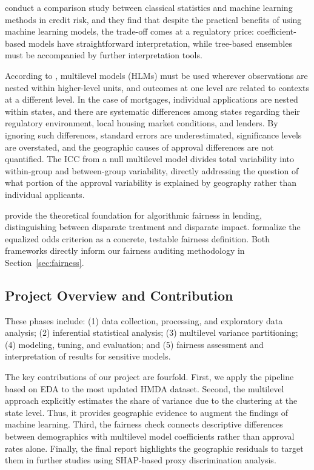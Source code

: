\documentclass[12pt,letterpaper]{article}
\begin{document}
\citet{zhang2024} conduct a comparison study between classical statistics and machine learning
methods in credit risk, and they find that despite the practical benefits of using machine learning models,
the trade-off comes at a regulatory price: coefficient-based models have straightforward interpretation,
while tree-based ensembles must be accompanied by further interpretation tools.

According to \citet{raudenbush2002}, multilevel models (HLMs) must be used wherever observations
are nested within higher-level units, and outcomes at one level are related to contexts at a
different level. In the case of mortgages, individual applications are nested within states, and
there are systematic differences among states regarding their regulatory environment, local
housing market conditions, and lenders. By ignoring such differences, standard errors are
underestimated, significance levels are overstated, and the geographic causes of approval
differences are not quantified. The ICC from a null multilevel model divides total variability
into within-group and between-group variability, directly addressing the question of what
portion of the approval variability is explained by geography rather than individual applicants.

\citet{barocas2016} provide the theoretical foundation for algorithmic fairness in lending,
distinguishing between disparate treatment and disparate impact. \citet{hardt2016} formalize
the equalized odds criterion as a concrete, testable fairness definition. Both frameworks
directly inform our fairness auditing methodology in Section~\ref{sec:fairness}.

\subsection{Project Overview and Contribution}

These phases include: (1) data collection, processing, and exploratory data analysis; (2) inferential
statistical analysis; (3) multilevel variance partitioning; (4) modeling, tuning, and evaluation; and (5)
fairness assessment and interpretation of results for sensitive models.

The key contributions of our project are fourfold. First, we apply the pipeline based on EDA to
the most updated HMDA dataset. Second, the multilevel approach explicitly estimates the share of
variance due to the clustering at the state level. Thus, it provides geographic evidence to augment
the findings of machine learning. Third, the fairness check connects descriptive differences between
demographics with multilevel model coefficients rather than approval rates alone. Finally, the final
report highlights the geographic residuals to target them in further studies using SHAP-based
proxy discrimination analysis.
\end{document}
